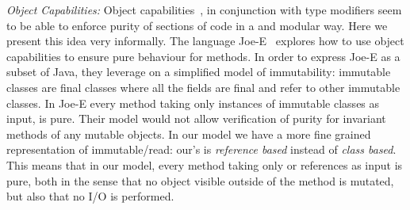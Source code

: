 \noindent
\textit{Object Capabilities:}
Object capabilities~\cite{RobustComposition}, in conjunction with type modifiers seem to be able to
 enforce purity of sections of code in a  and modular way.
Here we present this idea very informally.
The language Joe-E~\cite{finifter2008verifiable}
explores how to use object capabilities to ensure
pure behaviour for methods.
In order to express Joe-E as a subset of Java,
they leverage on a simplified model of immutability:
immutable classes are final classes where all the fields are final and refer to other immutable classes.
In Joe-E every method taking only instances of immutable classes as input, is pure.
Their model would not allow verification of purity for invariant methods of any mutable objects.
In our model we have a more fine grained representation of immutable/read:
our’s is \emph{reference based} instead of \emph{class based}.
This means that in our model, every method taking only \Q@read@ or \Q@imm@ references as input is pure,
both in the sense that no object visible outside of the method is mutated, but also
that no I/O is performed.



